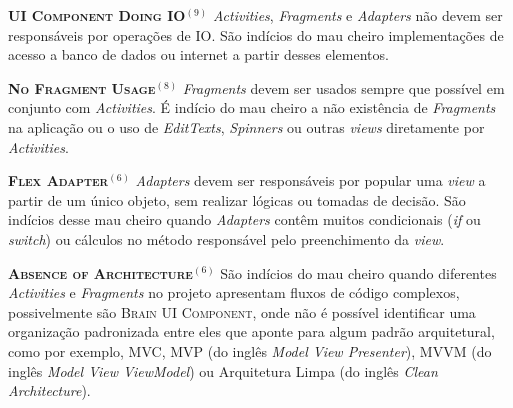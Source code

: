   \noindent
  \textsc{\textbf{{\small UI Component Doing IO}}}$^{(9)}$
      \textit{Activities}, \textit{Fragments} e \textit{Adapters} não devem ser responsáveis por operações de IO. São indícios do mau cheiro implementações de acesso a banco de dados ou internet a partir desses elementos.



  \noindent
  \textsc{\textbf{{\small No Fragment Usage}}}$^{(8)}$ \textit{Fragments} devem ser usados sempre que possível em conjunto com \textit{Activities}. É indício do mau cheiro a não existência de \textit{Fragments} na aplicação ou o uso de \textit{EditTexts}, \textit{Spinners} ou outras \textit{views} diretamente por \textit{Activities}.



  \noindent
  \textsc{\textbf{{\small Flex Adapter}}}$^{(6)}$ \textit{Adapters} devem ser responsáveis por popular uma \textit{view} a partir de um único objeto, sem realizar lógicas ou tomadas de decisão. São indícios desse mau cheiro quando \textit{Adapters} contêm muitos condicionais (\textit{if} ou \textit{switch}) ou cálculos no método responsável pelo preenchimento da \textit{view}.




  \noindent
  \textsc{\textbf{{\small Absence of Architecture}}}$^{(6)}$ São indícios do mau cheiro quando diferentes \textit{Activities} e \textit{Fragments} no projeto apresentam fluxos de código complexos, possivelmente são \textsc{\small Brain UI Component}, onde não é possível identificar uma organização padronizada entre eles que aponte para algum padrão arquitetural, como por exemplo, MVC, MVP (do inglês \textit{Model View Presenter}), MVVM (do inglês \textit{Model View ViewModel}) ou Arquitetura Limpa (do inglês \textit{Clean Architecture}).

